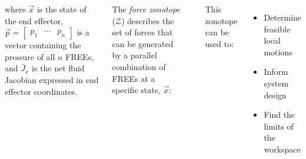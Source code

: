 \documentclass[25pt, a0paper, portrait]{tikzposter}
\newcommand{\mtx}[1]{\begin{bmatrix} #1 \end{bmatrix}}
\begin{document}
\begin{columns}
{{\begin{minipage}[c]{0.65\linewidth}
        where $\vec{x}$ is the state of the end effector, $\vec{p} = \mtx{p_1 & \cdots & p_n}$ is a vector containing the pressure of all $n$ FREEs, and $\bar{J}_x$ is the net fluid Jacobian expressed in end effector coordinates.
    \end{minipage}
    
    \begin{minipage}[c]{0.55\linewidth}
        The \emph{force zonotope} ($\mathcal{Z}$) describes the set of forces that can be generated by a parallel combination of FREEs at a specific state, $\vec{x}$:
        
        \vspace{18pt}
        \begin{centering}
        \end{centering}
        
        This zonotope can be used to:
        \begin{itemize}
            \setlength{\itemindent}{1in}
            \item Determine feasible local motions
            \item Inform system design
            \item Find the limits of the workspace
        \end{itemize}
    \end{minipage}
    \hspace{25pt}
    \begin{minipage}[c]{0.4\linewidth}
        \centering
        
    \end{minipage}
    }
}



\end{columns}
\end{document}
